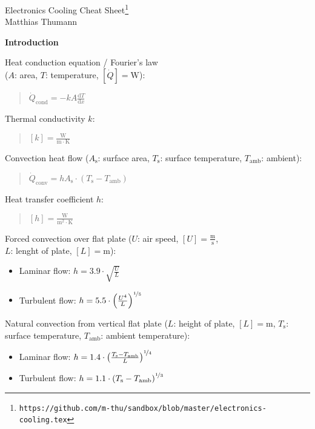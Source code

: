 \documentclass[fontsize=9pt,a4paper,twocolumn]{scrartcl}
\begin{document}
\clearpage
\pagestyle{empty}
\huge{Electronics Cooling Cheat Sheet}\footnote{\small{\texttt{https://github.com/m-thu/sandbox/blob/master/electronics-cooling.tex}}}\\
\large{Matthias Thumann}
\vspace*{0.5cm}

\large{\textbf{Introduction}}

Heat conduction equation / Fourier's law\\ ($A$: area, $T$: temperature, $[\dot Q] = \mathrm{W}$):
\begin{quote}
	$\dot Q_\mathrm{cond} = -kA\frac{\mathrm{d}T}{\mathrm{d}x}$
\end{quote}

Thermal conductivity $k$:
\begin{quote}
	$[k]=\frac{\mathrm{W}}{\mathrm{m}\cdot\mathrm{K}}$
\end{quote}

Convection heat flow ($A_\mathrm{s}$: surface area, $T_\mathrm{s}$: surface temperature, $T_\mathrm{amb}$: ambient):
\begin{quote}
	$\dot Q_\mathrm{conv}=h A_\mathrm{s}\cdot(T_\mathrm{s}-T_\mathrm{amb})$
\end{quote}

Heat transfer coefficient $h$:
\begin{quote}
	$[h]=\frac{\mathrm{W}}{\mathrm{m}^2\cdot\mathrm{K}}$
\end{quote}

Forced convection over flat plate ($U$: air speed, $[U]=\frac{\mathrm{m}}{\mathrm{s}}$,\\ $L$: lenght of plate, $[L]=\mathrm{m}$):
\begin{itemize}
	\item Laminar flow: $h=3.9\cdot\sqrt{\frac{U}{L}}$
	\item Turbulent flow: $h=5.5\cdot\left(\frac{U^4}{L}\right)^{\nicefrac{1}{5}}$
\end{itemize}

Natural convection from vertical flat plate ($L$: height of plate, $[L]=\mathrm{m}$, $T_\mathrm{s}$: surface temperature, $T_\mathrm{amb}$: ambient temperature):
\begin{itemize}
	\item Laminar flow: $h=1.4\cdot\left(\frac{T_\mathrm{s}-T_\mathrm{amb}}{L}\right)^{\nicefrac{1}{4}}$
	\item Turbulent flow: $h=1.1\cdot\left(T_\mathrm{s}-T_\mathrm{amb}\right)^{\nicefrac{1}{3}}$
\end{itemize}
\end{document}
